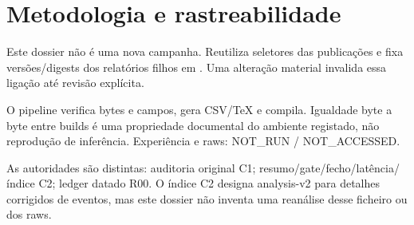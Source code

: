 \section{Metodologia e rastreabilidade}
Este dossier não é uma nova campanha. Reutiliza seletores das publicações e fixa versões/digests dos relatórios filhos em . Uma alteração material invalida essa ligação até revisão explícita.

O pipeline verifica bytes e campos, gera CSV/TeX e compila. Igualdade byte a byte entre builds é uma propriedade documental do ambiente registado, não reprodução de inferência. Experiência e raws: NOT\_RUN / NOT\_ACCESSED.

As autoridades são distintas: auditoria original C1; resumo/gate/fecho/latência/índice C2; ledger datado R00. O índice C2 designa analysis-v2 para detalhes corrigidos de eventos, mas este dossier não inventa uma reanálise desse ficheiro ou dos raws. 
